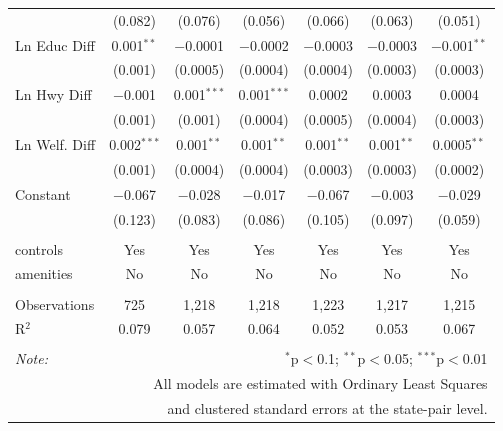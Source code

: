 \begin{table}[!htbp]
\begin{tabular}{@{\extracolsep{5pt}}lcccccc}
  & (0.082) & (0.076) & (0.056) & (0.066) & (0.063) & (0.051) \\ 
  Ln Educ Diff & 0.001$^{**}$ & $-$0.0001 & $-$0.0002 & $-$0.0003 & $-$0.0003 & $-$0.001$^{**}$ \\ 
  & (0.001) & (0.0005) & (0.0004) & (0.0004) & (0.0003) & (0.0003) \\ 
  Ln Hwy Diff & $-$0.001 & 0.001$^{***}$ & 0.001$^{***}$ & 0.0002 & 0.0003 & 0.0004 \\ 
  & (0.001) & (0.001) & (0.0004) & (0.0005) & (0.0004) & (0.0003) \\ 
  Ln Welf. Diff & 0.002$^{***}$ & 0.001$^{**}$ & 0.001$^{**}$ & 0.001$^{**}$ & 0.001$^{**}$ & 0.0005$^{**}$ \\ 
  & (0.001) & (0.0004) & (0.0004) & (0.0003) & (0.0003) & (0.0002) \\ 
  Constant & $-$0.067 & $-$0.028 & $-$0.017 & $-$0.067 & $-$0.003 & $-$0.029 \\ 
  & (0.123) & (0.083) & (0.086) & (0.105) & (0.097) & (0.059) \\ 
 \hline \\[-1.8ex] 
controls & Yes & Yes & Yes & Yes & Yes & Yes \\ 
amenities & No & No & No & No & No & No \\ 
\hline \\[-1.8ex] 
Observations & 725 & 1,218 & 1,218 & 1,223 & 1,217 & 1,215 \\ 
R$^{2}$ & 0.079 & 0.057 & 0.064 & 0.052 & 0.053 & 0.067 \\ 
\hline 
\hline \\[-1.8ex] 
\textit{Note:}  & \multicolumn{6}{r}{$^{*}$p$<$0.1; $^{**}$p$<$0.05; $^{***}$p$<$0.01} \\ 
 & \multicolumn{6}{r}{All models are estimated with Ordinary Least Squares} \\ 
 & \multicolumn{6}{r}{and clustered standard errors at the state-pair level.} \\ 
\end{tabular} 
\end{table} 
